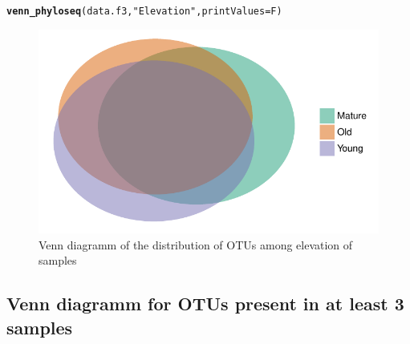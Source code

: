 \documentclass[12pt]{article}\usepackage[]{graphicx}\usepackage[]{color}
\makeatletter
\def\maxwidth{ %
  \ifdim\Gin@nat@width>\linewidth
    \linewidth
  \else
    \Gin@nat@width
  \fi
}
\newcommand{\hlstr}[1]{\textcolor[rgb]{0.192,0.494,0.8}{#1}}%
\newcommand{\hlstd}[1]{\textcolor[rgb]{0.345,0.345,0.345}{#1}}%
\newcommand{\hlkwc}[1]{\textcolor[rgb]{0.333,0.667,0.333}{#1}}%
\newcommand{\hlkwd}[1]{\textcolor[rgb]{0.737,0.353,0.396}{\textbf{#1}}}%
\newenvironment{kframe}{%
 \def\at@end@of@kframe{}%
 \ifinner\ifhmode%
  \def\at@end@of@kframe{\end{minipage}}%
  \begin{minipage}{\columnwidth}%
 \fi\fi%
 \def\FrameCommand##1{\hskip\@totalleftmargin \hskip-\fboxsep
 \colorbox{shadecolor}{##1}\hskip-\fboxsep
     \hskip-\linewidth \hskip-\@totalleftmargin \hskip\columnwidth}%
 \MakeFramed {\advance\hsize-\width
   \@totalleftmargin\z@ \linewidth\hsize
   \@setminipage}}%
 {\par\unskip\endMakeFramed%
 \at@end@of@kframe}
\newenvironment{knitrout}{}{} %
\numberwithin{figure}{section}
\makeatother
\begin{document}
\begin{knitrout}\small
{}\color{fgcolor}\begin{kframe}
\begin{alltt}
\hlkwd{venn_phyloseq}\hlstd{(data.f3,} \hlstr{"Elevation"}\hlstd{,} \hlkwc{printValues} \hlstd{= F)}
\end{alltt}
\end{kframe}\begin{figure}

{\centering \includegraphics[width=\maxwidth]{figure/unnamed-chunk-49-1} 

}

\caption[Venn diagramm of the distribution of OTUs among elevation of samples]{Venn diagramm of the distribution of OTUs among elevation of samples}\label{fig:unnamed-chunk-49}
\end{figure}


\end{knitrout}

  \subsection{Venn diagramm for OTUs present in at least 3 samples}
\end{document}
